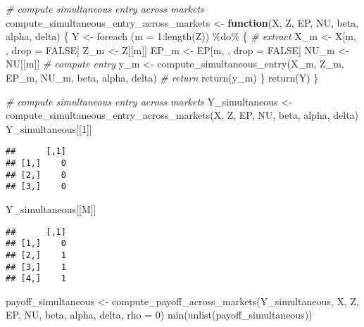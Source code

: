 \documentclass[
]{article}
\newenvironment{Shaded}{\begin{snugshade}}{\end{snugshade}}
\newcommand{\AttributeTok}[1]{\textcolor[rgb]{0.77,0.63,0.00}{#1}}
\newcommand{\CommentTok}[1]{\textcolor[rgb]{0.56,0.35,0.01}{\textit{#1}}}
\newcommand{\ConstantTok}[1]{\textcolor[rgb]{0.00,0.00,0.00}{#1}}
\newcommand{\ControlFlowTok}[1]{\textcolor[rgb]{0.13,0.29,0.53}{\textbf{#1}}}
\newcommand{\DecValTok}[1]{\textcolor[rgb]{0.00,0.00,0.81}{#1}}
\newcommand{\FunctionTok}[1]{\textcolor[rgb]{0.00,0.00,0.00}{#1}}
\newcommand{\NormalTok}[1]{#1}
\newcommand{\OtherTok}[1]{\textcolor[rgb]{0.56,0.35,0.01}{#1}}
\newcommand{\SpecialCharTok}[1]{\textcolor[rgb]{0.00,0.00,0.00}{#1}}
\begin{document}
\begin{Shaded}
\begin{Highlighting}[]
\CommentTok{\# compute simultaneous entry across markets}
\NormalTok{compute\_simultaneous\_entry\_across\_markets }\OtherTok{\textless{}{-}}
  \ControlFlowTok{function}\NormalTok{(X, Z, EP, NU, beta, alpha, delta) \{}
\NormalTok{    Y }\OtherTok{\textless{}{-}}
      \FunctionTok{foreach}\NormalTok{ (}\AttributeTok{m =} \DecValTok{1}\SpecialCharTok{:}\FunctionTok{length}\NormalTok{(Z)) }\SpecialCharTok{\%do\%}\NormalTok{ \{}
        \CommentTok{\# extract}
\NormalTok{        X\_m }\OtherTok{\textless{}{-}}\NormalTok{ X[m, , drop }\OtherTok{=} \ConstantTok{FALSE}\NormalTok{]}
\NormalTok{        Z\_m }\OtherTok{\textless{}{-}}\NormalTok{ Z[[m]]}
\NormalTok{        EP\_m }\OtherTok{\textless{}{-}}\NormalTok{ EP[m, , drop }\OtherTok{=} \ConstantTok{FALSE}\NormalTok{]}
\NormalTok{        NU\_m }\OtherTok{\textless{}{-}}\NormalTok{ NU[[m]]}
        \CommentTok{\# compute entry}
\NormalTok{        y\_m }\OtherTok{\textless{}{-}} \FunctionTok{compute\_simultaneous\_entry}\NormalTok{(X\_m, Z\_m, EP\_m, NU\_m, beta, alpha, delta)}
        \CommentTok{\# return}
        \FunctionTok{return}\NormalTok{(y\_m)}
\NormalTok{      \}}
    \FunctionTok{return}\NormalTok{(Y)}
\NormalTok{  \}}

\CommentTok{\# compute simultaneous entry across markets}
\NormalTok{Y\_simultaneous }\OtherTok{\textless{}{-}}
  \FunctionTok{compute\_simultaneous\_entry\_across\_markets}\NormalTok{(X, Z, EP, NU, beta, alpha, delta)}
\NormalTok{Y\_simultaneous[[}\DecValTok{1}\NormalTok{]]}
\end{Highlighting}
\end{Shaded}

\begin{verbatim}
##      [,1]
## [1,]    0
## [2,]    0
## [3,]    0
\end{verbatim}

\begin{Shaded}
\begin{Highlighting}[]
\NormalTok{Y\_simultaneous[[M]]}
\end{Highlighting}
\end{Shaded}

\begin{verbatim}
##      [,1]
## [1,]    0
## [2,]    1
## [3,]    1
## [4,]    1
\end{verbatim}

\begin{Shaded}
\begin{Highlighting}[]
\NormalTok{payoff\_simultaneous }\OtherTok{\textless{}{-}}
  \FunctionTok{compute\_payoff\_across\_markets}\NormalTok{(Y\_simultaneous, X, Z, EP, NU, beta, alpha, delta, }\AttributeTok{rho =} \DecValTok{0}\NormalTok{)}
\FunctionTok{min}\NormalTok{(}\FunctionTok{unlist}\NormalTok{(payoff\_simultaneous))}
\end{Highlighting}
\end{Shaded}
\end{document}
